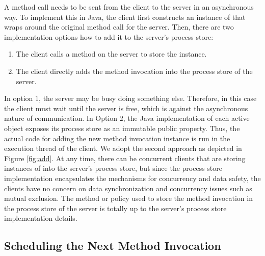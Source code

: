 A method call needs to be sent from the client to the server in an asynchronous way. 
To implement this in Java, the client first constructs an instance of
\MethodInvocation that wraps around the original method call for the server.
Then, 
%
there are two implementation options how to add it to the server's process store:
\begin{enumerate}
  \item The client calls a method on the server to store the instance.
  \item The client directly adds the method invocation into the process
store of the server. 
\end{enumerate}

In option $1$, the server may be busy doing something else. Therefore,
in this case the client must wait until the server is free,  which is
against the asynchronous nature of communication. In Option $2$, the
Java implementation of each active object exposes its process store as
an immutable public property. Thus, the actual code for adding the new
method invocation instance is run in the execution thread of the
client. 
We adopt the second approach as depicted in Figure \ref{fig:add}.
At any time, there can be concurrent clients that are
storing instances of  into the server's process store, but since
the process store implementation encapsulates the mechanisms for concurrency and
data safety, the clients have no concern on data synchronization and concurrency
issues such as mutual exclusion.
The method or policy used to store the method invocation in the process store of
the server is totally up to the server's process store implementation details.

\subsection{Scheduling the Next Method Invocation}

